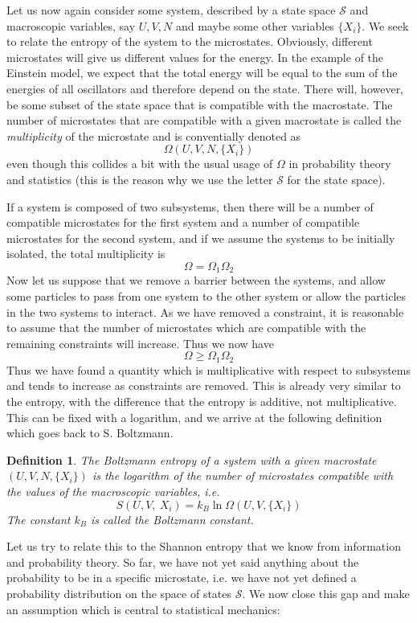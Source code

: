 \documentclass[a4paper, draft]{article}
\theoremstyle{own}
\newtheorem{defn}{Definition}[section]
\theoremstyle{remark}
\begin{document}
Let us now again consider some system, described by a state space ${\mathcal S}$ and macroscopic variables, say $U, V, N$ and maybe some other variables $\{X_i \}$. We seek to relate the entropy of the system to the microstates. Obviously, different microstates will give us different values for the energy. In the example of the Einstein model, we expect that the total energy will be equal to the sum of the energies of all oscillators and therefore depend on the state. There will, however, be some subset of the state space that is compatible with the macrostate. The number of microstates that are compatible with a given macrostate is called the {\em multiplicity} of the microstate and is conventially denoted as
$$
\Omega(U,V,N, \{ X_i\})
$$
even though this collides a bit with the usual usage of $\Omega$ in probability theory and statistics (this is the reason why we use the letter ${\mathcal S}$ for the state space).

If a system is composed of two subsystems, then there will be a number of compatible microstates for the first system and a number of compatible microstates for the second system, and if we assume the systems to be initially isolated, the total multiplicity is
$$
\Omega = \Omega_1 \Omega_2
$$
Now let us suppose that we remove a barrier between the systems, and allow some particles to pass from one system to the other system or allow the particles in the two systems to interact. As we have removed a constraint, it is reasonable to assume that the number of microstates which are compatible with the remaining constraints will increase. Thus we now have
$$
\Omega \geq \Omega_1 \Omega_2
$$
Thus we have found a quantity which is multiplicative with respect to subsystems and tends to increase as constraints are removed. This is already very similar to the entropy, with the difference that the entropy is additive, not multiplicative. This can be fixed with a logarithm, and we arrive at the following definition which goes back to S. Boltzmann.

\begin{defn}
The {\em Boltzmann entropy} of a system with a given macrostate $(U,V,N, \{X_i\})$ is the logarithm of the number of microstates compatible with the values of the macroscopic variables, i.e.
$$
S(U,V,{\ X_i}) = k_B \ln \Omega(U,V,\{ X_i\})
$$
The constant $k_B$ is called the {\em Boltzmann constant}.
\end{defn}

Let us try to relate this to the Shannon entropy that we know from information and probability theory. So far, we have not yet said anything about the probability to be in a specific microstate, i.e. we have not yet defined a probability distribution on the space of states ${\mathcal S}$. We now close this gap and make an assumption which is central to statistical mechanics: 
\end{document}
